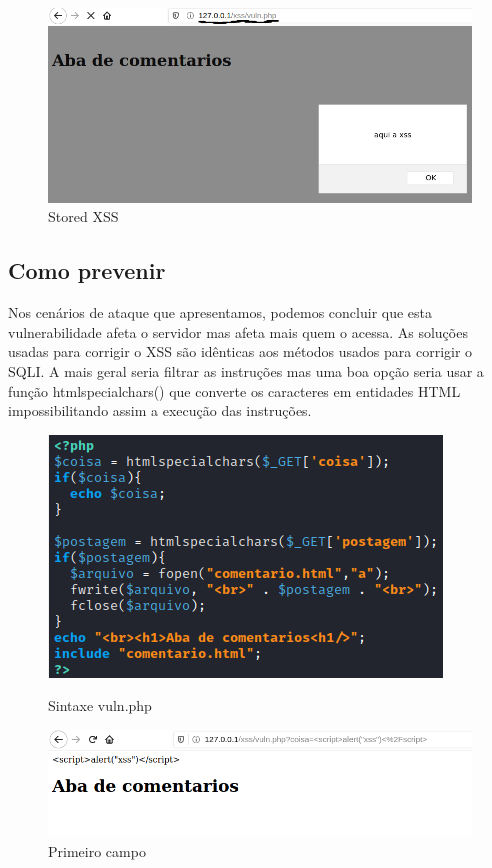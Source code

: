 \documentclass{report}
\begin{document}
\begin{figure}[h]
 \centering
 \includegraphics[scale=0.3]{imagessql/Fig15.png}
 \caption{Stored XSS}\label{Stored XSS}
\end{figure}
\clearpage

\subsection{Como prevenir}

Nos cenários de ataque que apresentamos, podemos concluir que esta vulnerabilidade afeta o servidor mas afeta mais quem o acessa. As soluções usadas para corrigir o XSS são idênticas aos métodos usados para corrigir o SQLI. A mais geral seria filtrar as instruções mas uma boa opção seria usar a função htmlspecialchars() que converte os caracteres em entidades HTML impossibilitando assim a execução das instruções.

\begin{figure}[!htb]
  \includegraphics[width=\linewidth]{imagessqlcode/sqlcode4.png}
  \caption{Sintaxe vuln.php}\label{Sintaxe vuln.php}
\endminipage\hfill
{}
  \includegraphics[width=\linewidth]{imagessql/Fig16.png}
  \caption{Primeiro campo}\label{Primeiro campo}
\endminipage
\end{figure}
\end{document}
